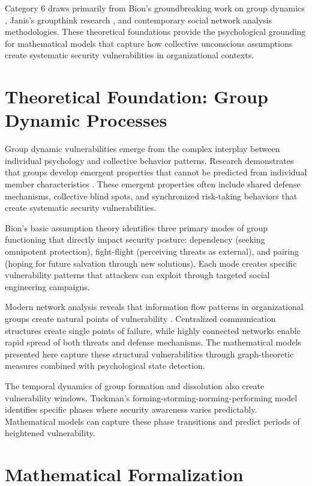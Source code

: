 \documentclass[11pt,a4paper]{article}
\begin{document}
Category 6 draws primarily from Bion's groundbreaking work on group dynamics \cite{bion1961}, Janis's groupthink research \cite{janis1971}, and contemporary social network analysis methodologies. These theoretical foundations provide the psychological grounding for mathematical models that capture how collective unconscious assumptions create systematic security vulnerabilities in organizational contexts.

\section{Theoretical Foundation: Group Dynamic Processes}

Group dynamic vulnerabilities emerge from the complex interplay between individual psychology and collective behavior patterns. Research demonstrates that groups develop emergent properties that cannot be predicted from individual member characteristics \cite{arrow2000}. These emergent properties often include shared defense mechanisms, collective blind spots, and synchronized risk-taking behaviors that create systematic security vulnerabilities.

Bion's \cite{bion1961} basic assumption theory identifies three primary modes of group functioning that directly impact security posture: dependency (seeking omnipotent protection), fight-flight (perceiving threats as external), and pairing (hoping for future salvation through new solutions). Each mode creates specific vulnerability patterns that attackers can exploit through targeted social engineering campaigns.

Modern network analysis reveals that information flow patterns in organizational groups create natural points of vulnerability \cite{watts1998}. Centralized communication structures create single points of failure, while highly connected networks enable rapid spread of both threats and defense mechanisms. The mathematical models presented here capture these structural vulnerabilities through graph-theoretic measures combined with psychological state detection.

The temporal dynamics of group formation and dissolution also create vulnerability windows. Tuckman's \cite{tuckman1965} forming-storming-norming-performing model identifies specific phases where security awareness varies predictably. Mathematical models can capture these phase transitions and predict periods of heightened vulnerability.

\section{Mathematical Formalization}
\end{document}
